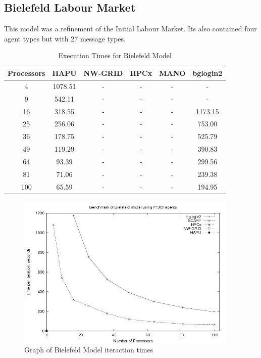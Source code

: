 \subsection{Bielefeld Labour Market}
This model was a refinement of the Initial Labour Market. Its also contained four agent types but with 27 message types.
{
\renewcommand{\arraystretch}{1.25}
\begin{table}[ht]
 \centering
  \begin{tabular}{c|ccccc}
 Processors &HAPU  &NW-GRID &HPCx  &MANO   &bglogin2 \\ \hline
 4   &1078.51  &-   &-   &-   &-   \\
 9   &542.11   &-   &-   &-   &-   \\
 16   &318.55   &-   &-   &-   &1173.15  \\
 25   &256.06   &-   &-   &-   &753.00   \\
 36   &178.75   &-   &-   &-   &525.79   \\
 49   &119.29   &-   &-   &-   &390.83   \\
 64   &93.39  &-   &-   &-   &299.56   \\
 81   &71.06   &-   &-   &-   &239.38   \\
 100   &65.59   &-   &-   &-   &194.95   \\
 \end{tabular}
 \caption{Execution Times for Bielefeld Model}
 \label{tab:ExecutionTimesForBielefeld}
\end{table}
}
\bigskip
\begin{figure}[ht]
 \centering
  \includegraphics[width=300pt]{Bielefeld2-graph.jpg}
 \caption{Graph of Bielefeld Model iteraction times}
 \label{fig:Labour-graph2}
\end{figure}

